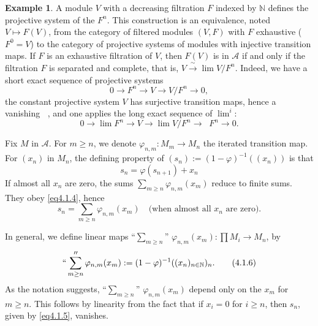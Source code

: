 \documentclass[11pt,a4paper]{article}
\theoremstyle{plain}
\theoremstyle{definition}
\newtheorem{example}[theorem]{Example}
\DeclareMathOperator{\limone}{\lim\nolimits^{1}}
\numberwithin{equation}{section}
\begin{document}
\begin{example}\label{ex4.1.3}
A module $V$ with a decreasing filtration $F$ indexed by $\mathbb{N}$ defines the projective system of the $F^{n}$. This construction is an equivalence, noted $V \mapsto F(V)$, from the category of filtered modules $(V,F)$ with $F$ exhaustive ($F^{0} = V$) to the category of projective systems of modules with injective transition maps. If $F$ is an exhaustive filtration of $V$, then $F(V)$ is in $\mathcal{A}$ if and only if the filtration $F$ is separated and complete, that is, $V \xrightarrow{\;\sim\;} \lim V/F^{n}$. Indeed, we have a short exact sequence of projective systems
\begin{equation*}
0 \to F^{n} \to V \to V/F^{n} \to 0,
\end{equation*}
the constant projective system $V$ has surjective transition maps, hence a vanishing $\limone$, and one applies the long exact sequence of $\lim^{i}$:
\begin{equation*}
0 \to \lim F^{n} \to V \to \lim V/F^{n} \to \limone F^{n} \to 0.
\end{equation*}
\end{example}

Fix $M$ in $\mathcal{A}$. For $m \geq n$, we denote $\varphi_{n,m}: M_{m} \to M_{n}$ the iterated transition map. For $(x_{n})$ in $M_{n}$, the defining property of $(s_{n}) := (1-\varphi)^{-1}((x_{n}))$ is that
\begin{equation}\label{eq4.1.4}
s_{n} = \varphi(s_{n+1}) + x_{n}
\tag{4.1.4}
\end{equation}
If almost all $x_{n}$ are zero, the sums $\sum_{m\geq n} \varphi_{n,m}(x_{m})$ reduce to finite sums. They obey \eqref{eq4.1.4}, hence
\begin{equation}\label{eq4.1.5}
s_{n} = \sum_{m\geq n} \varphi_{n,m}(x_{m}) \quad \text{(when almost all $x_{n}$ are zero).}
\tag{4.1.5}
\end{equation}

In general, we define linear maps ``$\sum_{m\geq n}$'' $\varphi_{n,m}(x_{m}): \prod M_{i} \to M_{n}$, by
\begin{equation}\label{eq4.1.6}
``\sum_{m\geq n}'' \varphi_{n,m}(x_{m}) := (1-\varphi)^{-1}((x_{n})_{n\in\mathbb{N}})_{n}.
\tag{4.1.6}
\end{equation}
As the notation suggests, ``$\sum_{m\geq n}$'' $\varphi_{n,m}(x_{m})$ depend only on the $x_{m}$ for $m \geq n$. This follows by linearity from the fact that if $x_{i} = 0$ for $i \geq n$, then $s_{n}$, given by \eqref{eq4.1.5}, vanishes.
\end{document}

